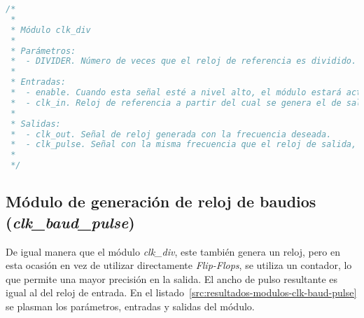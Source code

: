 \begin{lstlisting}[language=Verilog,
    caption={Parámetros, entradas y salidas del módulo clk\_div.},
    label=src:resultados-modulos-clk-div]
/*
 *
 * Módulo clk_div
 *
 * Parámetros:
 *  - DIVIDER. Número de veces que el reloj de referencia es dividido. f_clk_out = f_clk_in / (2^DIVIDER)
 *
 * Entradas:
 *  - enable. Cuando esta señal esté a nivel alto, el módulo estará activo, y en caso contrario la salida estará siempre a nivel bajo.
 *  - clk_in. Reloj de referencia a partir del cual se genera el de salida.
 *
 * Salidas:
 *  - clk_out. Señal de reloj generada con la frecuencia deseada.
 *  - clk_pulse. Señal con la misma frecuencia que el reloj de salida, pero con un ancho de pulso igual al del reloj de entrada.
 *
 */
\end{lstlisting}





\subsection{Módulo de generación de reloj de baudios (\emph{clk\_baud\_pulse})}
De igual manera que el módulo \emph{clk\_div}, este también genera un reloj, pero en esta ocasión en vez de utilizar directamente \emph{Flip-Flops}, se utiliza un contador, lo que permite una mayor precisión en la salida. El ancho de pulso resultante es igual al del reloj de entrada. En el listado~\ref{src:resultados-modulos-clk-baud-pulse} se plasman los parámetros, entradas y salidas del módulo.

